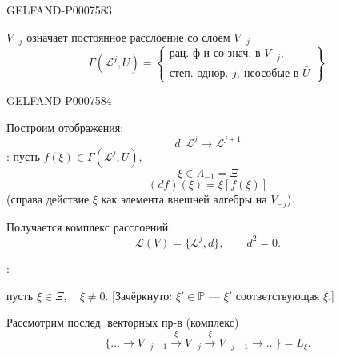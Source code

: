 \begin{GelfandAdjacentEvidence}{GELFAND-P000758}{3}


\(V_{-j}\) означает постоянное расслоение со слоем \(V_{-j}\)
\[
\Gamma(\mathcal L^j,U)=
\left\{\begin{gathered}
\text{рац. ф-и со знач. в }V_{-j},\\
\text{степ. однор. }j,\ \text{неособые в }\bar U
\end{gathered}\right\}.
\]
\end{GelfandAdjacentEvidence}
\begin{GelfandAdjacentEvidence}{GELFAND-P000758}{4}


Построим отображения:
\[
d:\mathcal L^j\longrightarrow\mathcal L^{j+1}
\]
: пусть
\(f(\xi)\in\Gamma(\mathcal L^j,U)\),
\[
\xi\in\Lambda_{-1}=\Xi
\]
\[
(df)(\xi)=\xi[f(\xi)]
\]
(справа действие \(\xi\) как элемента внешней алгебры на \(V_{-j}\)).

Получается комплекс расслоений:
\[
\mathcal L(V)=\{\mathcal L^j,d\},\qquad d^2=0.
\]

:

пусть \(\xi\in\Xi,\quad\xi\ne0\).
[Зачёркнуто: \(\xi'\in\mathbb P\) --- \(\xi'\) соответствующая \(\xi\).]
\end{GelfandAdjacentEvidence}


Рассмотрим послед. векторных пр-в (комплекс)
\[
\{\ldots\longrightarrow V_{-j+1}
\xrightarrow{\xi}V_{-j}\xrightarrow{\xi}V_{-j-1}
\longrightarrow\ldots\}=L_\xi.
\]


